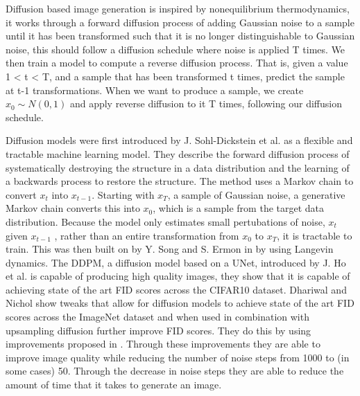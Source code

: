 \documentclass{UoYCSproject}
\begin{document}
Diffusion based image generation is inspired by nonequilibrium thermodynamics, it works through a forward diffusion process of adding Gaussian noise to a sample until it has been transformed such that it is no longer distinguishable to Gaussian noise, this should follow a diffusion schedule where noise is applied T times. We then train a model to compute a reverse diffusion process. That is, given a value 1 < t < T, and a sample that has been transformed t times, predict the sample at t-1 transformations. When we want to produce a sample, we create $ x_0 \sim N(0,1) $ and apply reverse diffusion to it T times, following our diffusion schedule. 

Diffusion models were first introduced by J. Sohl-Dickstein et al. \cite{sohldickstein2015deep} as a flexible and tractable machine learning model. They describe the forward diffusion process of systematically destroying the structure in a data distribution and the learning of a backwards process to restore the structure. The method uses a Markov chain to convert $ x_t $ into $ x_{t-1} $. Starting with $ x_T $, a sample of Gaussian noise, a generative Markov chain converts this into $ x_0 $, which is a sample from the target data distribution. Because the model only estimates small pertubations of noise, $ x_t $ given $ x_{t-1} $ , rather than an entire transformation from $ x_0 $ to $ x_T $, it is tractable to train. This was then built on by Y. Song and S. Ermon in \cite{song2020generative} by using Langevin dynamics.
The DDPM, a diffusion model based on a UNet, introduced by J. Ho et al. \cite{ho2020denoising} is capable of producing high quality images, they show that it is capable of achieving state of the art FID scores across the CIFAR10 dataset. Dhariwal and Nichol \cite{dhariwal2021diffusion} show tweaks that allow for diffusion models to achieve state of the art FID scores across the ImageNet dataset and when used in combination with upsampling diffusion further improve FID scores. They do this by using improvements proposed in \cite{song2022denoising, nichol2021improved, song2021scorebased, brock2019large, karras2019stylebased}. Through these improvements they are able to improve image quality while reducing the number of noise steps from 1000 to (in some cases) 50. Through the decrease in noise steps they are able to reduce the amount of time that it takes to generate an image.  

\end{document}
